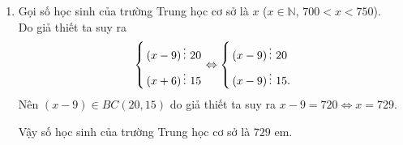 \begin{ex}
{\begin{enumerate}
	Khi đó 
	$$x^2 - y^2 = 89\Leftrightarrow \left(\left\vert  x \right\vert + \left\vert  y \right\vert\right)\left(\left\vert  x \right\vert - \left\vert  y \right\vert\right) = 89\quad (*)$$
	Vì $\left\vert  x \right\vert + \left\vert  y \right\vert  > \left\vert  x \right\vert - \left\vert  y \right\vert$ và $\left\vert  x \right\vert + \left\vert  y \right\vert > 0$  nên từ  $(*)$ ta suy ra 
	$$\heva{&\left\vert  x \right\vert - \left\vert  y \right\vert = 1\\
		&\left\vert  x \right\vert + \left\vert  y \right\vert = 89}\Leftrightarrow \heva{&\left\vert  x \right\vert = 45\\
		&\left\vert  y \right\vert = 44.}$$
	 Do đó $a = 2018$.
		\item Gọi số học sinh của trường Trung học cơ sở là $x$ ($x\in\mathbb{N}$, $700 < x < 750$).\\ Do giả thiết ta suy ra
	$$\left\{\begin{aligned}&\left(x - 9 \right)\vdots\  20\\
		&\left(x + 6\right)\vdots\  15\end{aligned}\right.\Leftrightarrow \left\{\begin{aligned}&\left(x - 9 \right)\vdots\  20\\
		&\left(x - 9\right)\vdots\  15.\end{aligned}\right.$$
	Nên $\left(x - 9\right)\in BC\left(20, 15\right)$ do giả thiết ta suy ra  $x - 9  = 720\Leftrightarrow x = 729$.
	
	Vậy số học sinh của trường Trung học cơ sở là $729$ em.
	\end{enumerate}

	}
\end{ex}
